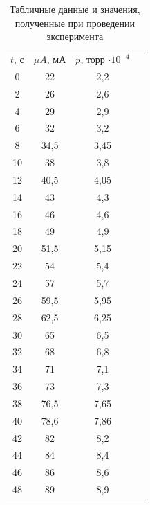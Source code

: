 \documentclass[a4paper,12pt]{article}
\begin{document}
\begin{table}%
	\centering
\begin{tabular}{|c|c|c|c|}
	\hline
	$t$, с & $\mu A$, мА & $p$, торр $\cdot 10^{-4}$ \\ \cline{1-3}
	0 & 22 & 2,2 \\ \cline{1-3}
	2 & 26 &  2,6 \\ \cline{1-3}
	4 & 29 &  2,9 \\ \cline{1-3}
	6 & 32 &  3,2 \\ \cline{1-3}
	8 & 34,5 &  3,45 \\ \cline{1-3}
	10 & 38 &  3,8 \\ \cline{1-3}
	12 & 40,5 &  4,05 \\ \cline{1-3}
	14 & 43 &  4,3 \\ \cline{1-3}
	16 & 46 &  4,6 \\ \cline{1-3}
	18 & 49 &  4,9 \\ \cline{1-3}
	20 & 51,5 &  5,15 \\ \cline{1-3}
	22 & 54 &  5,4 \\ \cline{1-3}
	24 & 57 &  5,7 \\ \cline{1-3}
	26 & 59,5 &  5,95 \\ \cline{1-3}
	28 & 62,5 &  6,25 \\ \cline{1-3}
	30 & 65 &  6,5 \\ \cline{1-3}
	32 & 68 &  6,8 \\ \cline{1-3}
	34 & 71 &  7,1 \\ \cline{1-3}
	36 & 73 &  7,3 \\ \cline{1-3}
	38 & 76,5 & 7,65 \\ \cline{1-3}
	40 & 78,6 &  7,86 \\ \cline{1-3}
	42 & 82 &  8,2 \\ \cline{1-3}
	44 & 84 &  8,4 \\ \cline{1-3}
	46 & 86 &  8,6 \\ \cline{1-3}
	48 & 89 &  8,9 \\ \cline{1-3}
\end{tabular}
	\caption{Табличные данные и значения, полученные при проведении эксперимента}
	\label{Tab:tab_exp}
\end{table}
\vspace{-1cm}
\end{document}
